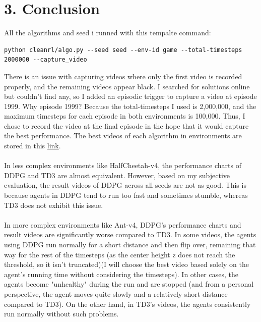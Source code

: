\documentclass[english, a4paper,12pt]{article}
\begin{document}
\section*{3. Conclusion}
\hspace*{5mm} All the algorithms and seed i runned with this tempalte command:
\begin{verbatim}
python cleanrl/algo.py --seed seed --env-id game --total-timesteps 2000000 --capture_video
\end{verbatim}
\hspace*{5mm} There is an issue with capturing videos where only the first video is recorded properly, and the remaining videos appear black. I searched for solutions online but couldn’t find any, so I added an episodic trigger to capture a video at episode 1999. Why episode 1999? Because the total-timesteps I used is 2,000,000, and the maximum timesteps for each episode in both environments is 100,000. Thus, I chose to record the video at the final episode in the hope that it would capture the best performance. The best videos of each algorithm in environments are stored in this \href{https://drive.google.com/drive/folders/1QlgdHN7lEf0Oh_XfwRc2fczze2t9ugJU?usp=sharing}{link}.
\\
\vspace*{-2mm}
\\
\hspace*{5mm} In less complex environments like HalfCheetah-v4, the performance charts of DDPG and TD3 are almost equivalent. However, based on my subjective evaluation, the result videos of DDPG across all seeds are not as good. This is because agents in DDPG tend to run too fast and sometimes stumble, whereas TD3 does not exhibit this issue.
\\
\vspace*{-2mm}
\\
\hspace*{5mm} In more complex environments like Ant-v4, DDPG's performance charts and result videos are significantly worse compared to TD3. In some videos, the agents using DDPG run normally for a short distance and then flip over, remaining that way for the rest of the timesteps (as the center height z does not reach the threshold, so it isn't truncated)(I will choose the best video based solely on the agent's running time without considering the timesteps). In other cases, the agents become "unhealthy" during the run and are stopped (and from a personal perspective, the agent moves quite slowly and a relatively short distance compared to TD3). On the other hand, in TD3's videos, the agents consistently run normally without such problems.
\end{document}
